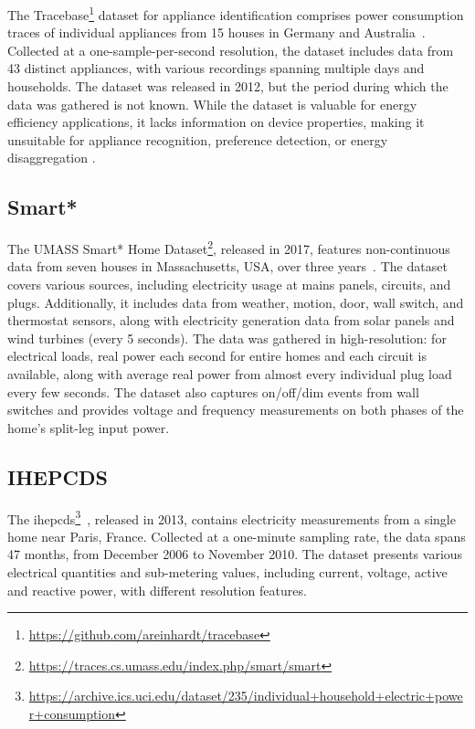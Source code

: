 The Tracebase\footnote{\url{https://github.com/areinhardt/tracebase}} dataset for appliance identification comprises power consumption traces of individual appliances from 15 houses in Germany and Australia~\parencite{reinhardtAccuracyApplianceIdentification2012}. Collected at a one-sample-per-second resolution, the dataset includes data from 43 distinct appliances, with various recordings spanning multiple days and households. The dataset was released in 2012, but the period during which the data was gathered is not known. While the dataset is valuable for energy efficiency applications, it lacks information on device properties, making it unsuitable for appliance recognition, preference detection, or energy disaggregation \parencite{himeurBuildingPowerConsumption2020}.

\subsection{Smart*}

The UMASS Smart* Home Dataset\footnote{\url{https://traces.cs.umass.edu/index.php/smart/smart}}, released in 2017, features non-continuous data from seven houses in Massachusetts, USA, over three years~\parencite{barkerSmartOpenData2012}. The dataset covers various sources, including electricity usage at mains panels, circuits, and plugs. Additionally, it includes data from weather, motion, door, wall switch, and thermostat sensors, along with electricity generation data from solar panels and wind turbines (every 5 seconds). The data was gathered in high-resolution: for electrical loads, real power each second for entire homes and each circuit is available, along with average real power from almost every individual plug load every few seconds. The dataset also captures on/off/dim events from wall switches and provides voltage and frequency measurements on both phases of the home’s split-leg input power.

\subsection{IHEPCDS}

The \acrlong{ihepcds}\footnote{\url{https://archive.ics.uci.edu/dataset/235/individual+household+electric+power+consumption}}~\parencite{georgeshebrailIndividualHouseholdElectric2006}, released in 2013, contains electricity measurements from a single home near Paris, France. Collected at a one-minute sampling rate, the data spans 47 months, from December 2006 to November 2010. The dataset presents various electrical quantities and sub-metering values, including current, voltage, active and reactive power, with different resolution features.


